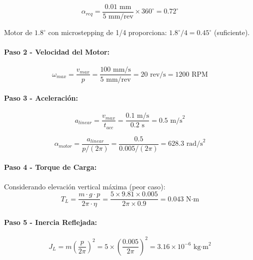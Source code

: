 \begin{equation}
\alpha_{req} = \frac{0.01 \text{ mm}}{5 \text{ mm/rev}} \times 360^\circ = 0.72^\circ
\end{equation}

Motor de $1.8^\circ$ con microstepping de 1/4 proporciona: $1.8^\circ/4 = 0.45^\circ$ (suficiente).

\paragraph{Paso 2 - Velocidad del Motor:}

\begin{equation}
\omega_{max} = \frac{v_{max}}{p} = \frac{100 \text{ mm/s}}{5 \text{ mm/rev}} = 20 \text{ rev/s} = 1200 \text{ RPM}
\end{equation}

\paragraph{Paso 3 - Aceleración:}

\begin{equation}
a_{linear} = \frac{v_{max}}{t_{acc}} = \frac{0.1 \text{ m/s}}{0.2 \text{ s}} = 0.5 \text{ m/s}^2
\end{equation}

\begin{equation}
\alpha_{motor} = \frac{a_{linear}}{p/(2\pi)} = \frac{0.5}{0.005/(2\pi)} = 628.3 \text{ rad/s}^2
\end{equation}

\paragraph{Paso 4 - Torque de Carga:}

Considerando elevación vertical máxima (peor caso):
\begin{equation}
T_L = \frac{m \cdot g \cdot p}{2\pi \cdot \eta} = \frac{5 \times 9.81 \times 0.005}{2\pi \times 0.9} = 0.043 \text{ N·m}
\end{equation}

\paragraph{Paso 5 - Inercia Reflejada:}

\begin{equation}
J_L = m \left(\frac{p}{2\pi}\right)^2 = 5 \times \left(\frac{0.005}{2\pi}\right)^2 = 3.16 \times 10^{-6} \text{ kg·m}^2
\end{equation}

